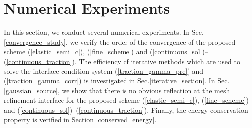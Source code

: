\section{Numerical Experiments}
In this section, we conduct several numerical experiments. In Sec.\ref{convergence_study}, we verify the order of the convergence of the proposed scheme (\ref{elastic_semi_c}), (\ref{fine_scheme}) and (\ref{continuous_sol})--(\ref{continuous_traction}). The efficiency of iterative methods which are used to solve the interface condition system (\ref{traction_gamma_pre}) and (\ref{traction_gamma_corr}) is investigated in Sec.\ref{iterative_section}. In Sec.\ref{gaussian_source}, we show that there is no obvious reflection at the mesh refinement interface for the proposed scheme (\ref{elastic_semi_c}), (\ref{fine_scheme}) and (\ref{continuous_sol})--(\ref{continuous_traction}). Finally, the energy conservation property is verified in Section \ref{conserved_energy}.